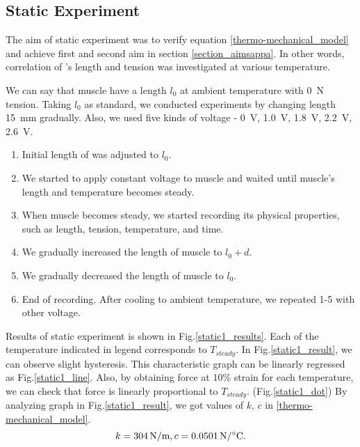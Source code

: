 \subsection{Static Experiment}
The aim of static experiment was to verify equation \eqref{thermo-mechanical_model} and achieve first and second aim in section \ref{section_aimsappa}. In other words, correlation of \scpnospace's length and tension was investigated at various temperature. 

We can say that muscle have a length $l_{0}$ at ambient temperature with \SI{0}{\newton} tension. Taking $l_{0}$ as standard, we conducted experiments by changing length \SI{15}{\milli\meter} gradually. Also, we used five kinds of voltage - \SI{0}{\volt}, \SI{1.0}{\volt}, \SI{1.8}{\volt}, \SI{2.2}{\volt}, \SI{2.6}{\volt}.

\begin{enumerate}
\item Initial length of \scp was adjusted to $l_0$.
\item We started to apply constant voltage to muscle and waited until muscle's length and temperature becomes steady.
\item When muscle becomes steady, we started recording its physical properties, such as length, tension, temperature, and time.
\item We gradually increased the length of muscle to $l_0+d$.
\item We gradually decreased the length of muscle to $l_0$.
\item End of recording. After cooling to ambient temperature, we repeated 1-5 with other voltage.
\end{enumerate}

Results of static experiment is shown in Fig.\ref{static1_results}. Each of the temperature indicated in legend corresponds to $T_{steady}$. In Fig.\ref{static1_result}, we can observe slight hysteresis. This characteristic graph can be linearly regressed as Fig.\ref{static1_line}. Also, by obtaining force at 10\% strain for each temperature, we can check that force is linearly proportional to $T_{steady}$. (Fig.\ref{static1_dot}) By analyzing graph in Fig.\ref{static1_result}, we got values of $k$, $c$ in \eqref{thermo-mechanical_model}.
\begin{equation}
k=\SI{304}{\newton\per\meter}, c=\SI{0.0501}{\newton\per\degreeCelsius}. \notag
\end{equation}

